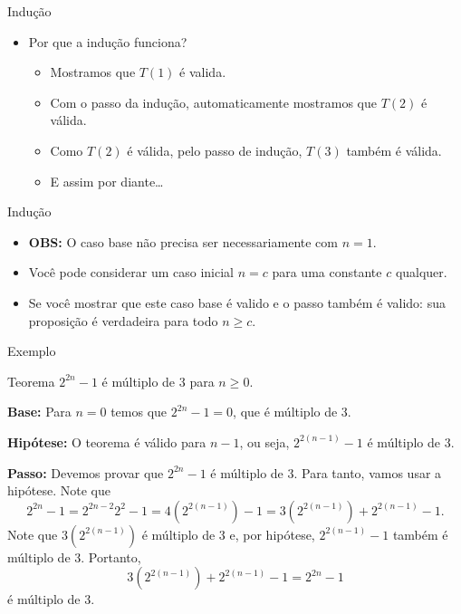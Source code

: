 \documentclass[handout]{beamer}
\begin{document}
\begin{frame}[fragile]{Indução}

    \begin{itemize}
        \item Por que a indução funciona?
        \begin{itemize}
            \item Mostramos que $T(1)$ é valida.
            \item Com o passo da indução, automaticamente mostramos que $T(2)$ é válida.
            \item Como $T(2)$ é válida, pelo passo de indução, $T(3)$ também é válida.
            \item E assim por diante\ldots
        \end{itemize}
    \end{itemize}
\end{frame}

\begin{frame}[fragile]{Indução}

    \begin{itemize}
        \item {\bf OBS:} O caso base não precisa ser necessariamente com $n=1$.
        \item Você pode considerar um caso inicial $n=c$ para uma constante $c$ qualquer.
        \item Se você mostrar que este caso base é valido e o passo também é valido: sua proposição é verdadeira para todo $n \geq c$.
    \end{itemize}
\end{frame}

\begin{frame}[fragile]{Exemplo}

    \begin{block}{Teorema}
        $2^{2n}-1$ é múltiplo de 3 para $n \geq 0$.
    \end{block}

    \pause
    {\bf Base:} Para $n=0$ temos que $2^{2n} -1 = 0$, que é múltiplo de 3.

    \pause
    {\bf Hipótese:} O teorema é válido para $n-1$, ou seja, $2^{2(n-1)}-1$ é múltiplo de 3.

    \pause
    {\bf Passo:} Devemos provar que $2^{2n} -1$ é múltiplo de 3.
    Para tanto, vamos usar a hipótese.
    \pause
    Note que $$2^{2n} -1 = 2^{2n-2}2^{2}-1=4(2^{2(n-1)}) -1 = 3(2^{2(n-1)}) + 2^{2(n-1)} -1.$$
    \pause
    Note que $3(2^{2(n-1)})$ é múltiplo de 3 e, por hipótese, $2^{2(n-1)} -1$ também é múltiplo de 3.
    \pause
    Portanto, $$3(2^{2(n-1)}) + 2^{2(n-1)} -1 = 2^{2n} -1$$ é múltiplo de 3.
\end{frame}
\end{document}
